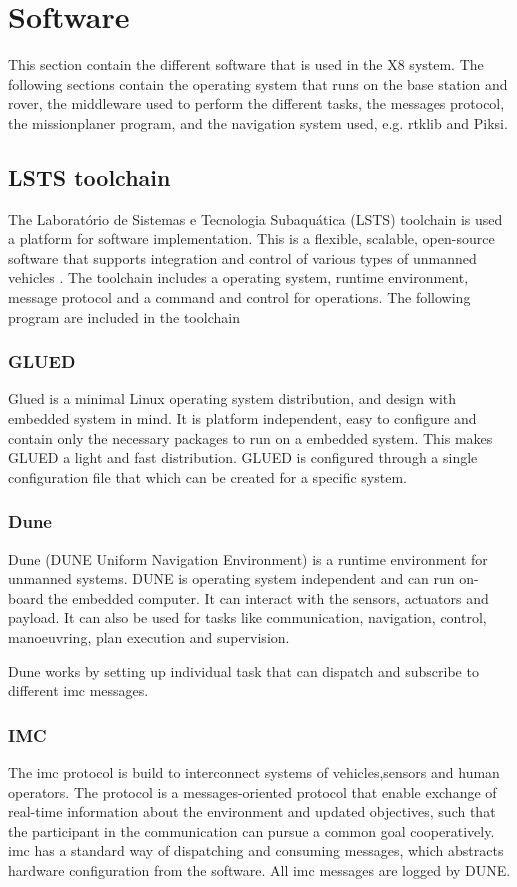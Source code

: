 \section{Software}\label{S:software}
This section contain the different software that is used in the X8 system. The following sections contain the operating system that runs on the base station and rover, the middleware used to perform the different tasks, the messages protocol, the missionplaner program, and the navigation system used, e.g. \gls{rtklib} and Piksi.
\subsection{LSTS toolchain}
The Laboratório de Sistemas e Tecnologia Subaquática (LSTS) toolchain is used a platform for software implementation. This is a flexible, scalable, open-source software that supports integration and control of various types of unmanned vehicles \citep{pinto2013lsts}. The toolchain includes a operating system, runtime environment, message protocol and a command and control for operations. The following program are included in the toolchain
\subsubsection{GLUED}
Glued is a minimal Linux operating system distribution, and design with embedded system in mind. It is platform independent, easy to configure and contain only the necessary packages to run on a embedded system. This makes GLUED a light and fast distribution. GLUED is configured through a single configuration file that which can be created for a specific system. 
\subsubsection{Dune}
Dune (DUNE Uniform Navigation Environment) is a runtime environment for unmanned systems. DUNE is operating system independent and can run on-board the embedded computer. It can interact with the sensors, actuators and payload. It can also be used for tasks like communication, navigation, control, manoeuvring, plan execution and supervision.

Dune works by setting up individual task that can dispatch and subscribe to different \gls{imc} messages.
\subsubsection{IMC}\label{ss:IMC}
The \acrfull{imc} protocol is build to interconnect systems of vehicles,sensors and human operators. The protocol is a messages-oriented protocol that enable exchange of real-time information about the environment and updated objectives, such that the participant in the communication can pursue a common goal cooperatively.
\gls{imc} has a standard way of dispatching and consuming messages, which abstracts hardware configuration from the software. All \gls{imc} messages are logged by DUNE.

